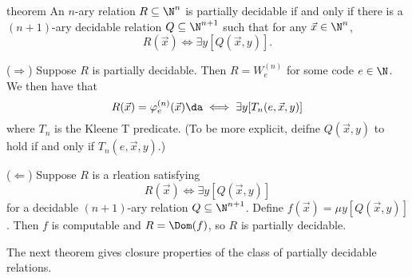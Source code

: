 \documentclass[class=article, crop=false]{standalone}
\begin{document}
\begin{result}{theorem}
  An $n$-ary relation $R \subseteq \N^n$ is partially decidable if and only if there is a $(n+1)$-ary decidable relation $Q \subseteq \N^{n+1}$ such that for any $\vec x \in \N^n$,
    \[
      R(\vec x) \iff \exists y [Q(\vec x,y)].
    \]
\end{result}
\begin{pf}
  ($\Rightarrow$) Suppose $R$ is partially decidable. Then $R = W_e^{(n)}$ for some code $e \in \N$. We then have that
    \[
      R(\vec x) = \varphi_e^{(n)}(\vec x) \da \iff \exists y [T_n(e,\vec x,y)]
    \]
  where $T_n$ is the Kleene T predicate. (To be more explicit, deifne $Q(\vec x,y)$ to hold if and only if $T_n(e, \vec x, y)$.)

  ($\Leftarrow$) Suppose $R$ is a rleation satisfying
    \[
      R(\vec x) \iff \exists y[Q(\vec x,y)]
    \]
  for a decidable $(n+1)$-ary relation $Q \subseteq \N^{n+1}$. Define $f(\vec x) = \mu y[Q(\vec x,y)]$. Then $f$ is computable and $R = \Dom(f)$, so $R$ is partially decidable.
\end{pf}

The next theorem gives closure properties of the class of partially decidable relations.
\end{document}
